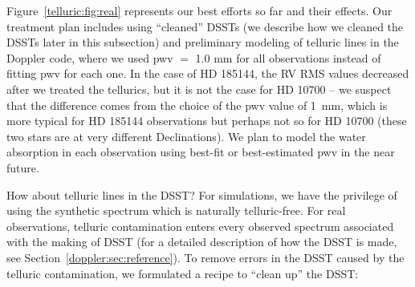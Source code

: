 Figure~\ref{telluric:fig:real} represents our best efforts so far and
their effects. Our treatment plan includes using ``cleaned'' DSSTs (we
describe how we cleaned the DSSTs later in this subsection) and
preliminary modeling of telluric lines in the Doppler code, where we
used pwv $=$ 1.0 mm for all observations instead of fitting pwv for
each one. In the case of HD 185144, the RV RMS values decreased after
we treated the tellurics, but it is not the case for HD 10700 -- we
suspect that the difference comes from the choice of the pwv value of
1~mm, which is more typical for HD 185144 observations but perhaps not
so for HD 10700 (these two stars are at very different
Declinations). We plan to model the water absorption in each
observation using best-fit or best-estimated pwv in the near future.

How about telluric lines in the DSST? For simulations, we have the
privilege of using the synthetic spectrum which is naturally
telluric-free. For real observations, telluric contamination enters
every observed spectrum associated with the making of DSST (for a
detailed description of how the DSST is made, see
Section~\ref{doppler:sec:reference}). To remove errors in the DSST
caused by the telluric contamination, we formulated a recipe to
``clean up'' the DSST:

